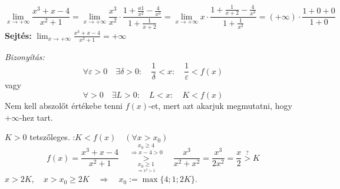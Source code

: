\documentclass[a4paper,11.5pt]{article}
\begin{document}
	\begin{task}
		\[ \lim_{x\to+\infty}\frac{x^3+x-4}{x^2+1}=\lim_{x\to+\infty}\frac{x^3}{x^2}\cdot\frac{1+\frac{a1}{x^2}-\frac{4}{x^3}}{1+\frac{1}{x+2}}=\lim_{x\to+\infty}x\cdot\frac{1+\frac{1}{x+2}-\frac{4}{x^3}}{1+\frac{1}{x^2}}=(+\infty)\cdot\frac{1+0+0}{1+0} \]
		\textbf{Sejtés:} $\displaystyle \lim_{x\to+\infty}\frac{x^3+x-4}{x^2+1}=+\infty$
		
		\medskip
		\textit{Bizonyítás:}
		\[ \forall\varepsilon>0\quad \exists\delta>0:\quad \frac{1}{\delta}<x:\quad \frac{1}{\varepsilon}<f(x) \]
		vagy
		\[ \forall >0\quad \exists L>0:\quad L<x:\quad K<f(x) \]
		Nem kell abszolőt értékebe tenni $f(x)$-et, mert azt akarjuk megmutatni, hogy $+\infty$-hez tart.
		
		\smallskip
		$K>0$ tetszőleges. :\quad $K<f(x)\quad (\forall x>x_0)$
		\[ f(x)=\frac{x^3+x-4}{x^2+1}\quad \overset{x_0\geq4}{\overset{\Rightarrow x-4>0}{\underset{\underset{\Rightarrow x^2>1}{x_0\geq1}}{>}}}\quad \frac{x^3}{x^2+x^2}=\frac{x^3}{2x^2}=\frac{x}{2}\overset{?}{>}K \]
		$x>2K,\quad x>x_0\geq2K\quad \Rightarrow\quad x_0:=\max\{ 4;1;2K \}$.
	\end{task}
\end{document}
